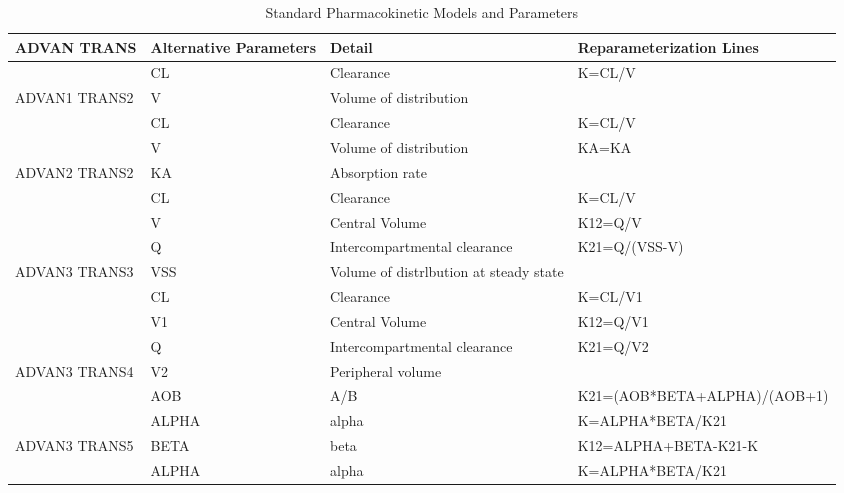 \documentclass[
  10pt,
  krantz2,
  a4paper]{krantz}
\theoremstyle{definition}
\theoremstyle{definition}
\theoremstyle{definition}
\theoremstyle{remark}
\begin{document}
\begin{table}

\caption{\label{tab:standard-pk-models}Standard Pharmacokinetic Models and Parameters}
\centering
\begin{tabular}[t]{l>{\raggedright\arraybackslash}p{1.5cm}>{\raggedright\arraybackslash}p{3cm}>{\raggedright\arraybackslash}p{6cm}}
\toprule
ADVAN TRANS & Alternative Parameters & Detail & Reparameterization Lines\\
\midrule
 & CL & Clearance & K=CL/V\\

\multirow[t]{-2}{*}{\raggedright\arraybackslash ADVAN1 TRANS2} & V & Volume of distribution & \\
\cmidrule{1-4}
 & CL & Clearance & K=CL/V\\

 & V & Volume of distribution & KA=KA\\

\multirow[t]{-3}{*}{\raggedright\arraybackslash ADVAN2 TRANS2} & KA & Absorption rate & \\
\cmidrule{1-4}
 & CL & Clearance & K=CL/V\\

 & V & Central Volume & K12=Q/V\\

 & Q & Intercompartmental clearance & K21=Q/(VSS-V)\\

\multirow[t]{-4}{*}{\raggedright\arraybackslash ADVAN3 TRANS3} & VSS & Volume of distrlbution at steady state & \\
\cmidrule{1-4}
 & CL & Clearance & K=CL/V1\\

 & V1 & Central Volume & K12=Q/V1\\

 & Q & Intercompartmental clearance & K21=Q/V2\\

\multirow[t]{-4}{*}{\raggedright\arraybackslash ADVAN3 TRANS4} & V2 & Peripheral volume & \\
\cmidrule{1-4}
 & AOB & A/B & K21=(AOB*BETA+ALPHA)/(AOB+1)\\

 & ALPHA & alpha & K=ALPHA*BETA/K21\\

\multirow[t]{-3}{*}{\raggedright\arraybackslash ADVAN3 TRANS5} & BETA & beta & K12=ALPHA+BETA-K21-K\\
\cmidrule{1-4}
 & ALPHA & alpha & K=ALPHA*BETA/K21\\


\end{tabular}
\end{table}
\end{document}
